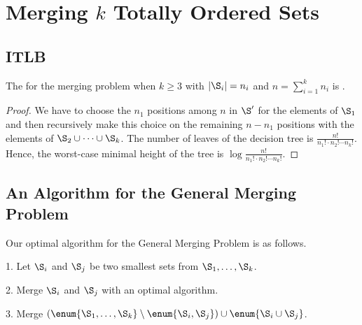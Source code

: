 \section{Merging $k$ Totally Ordered Sets}
\label{tree:merging:kgeq3}


\subsection*{ITLB}
\label{tree:merging:kgeq3:ITLB}


\begin{theorem}
The  for the merging problem when $k \geq 3$ with $|\S_i| = n_i$ and $n =
\sum_{i=1}^{k} n_i$ is .
\end{theorem}

\begin{proof}
We have to choose the $n_1$ positions among $n$ in $\S'$ for the elements of
$\S_1$ and then recursively make this choice on the remaining $n - n_1$
positions with the elements of \(\S_2 \cup \dots \cup \S_k\). The number of
leaves of the decision tree is $\frac{n!}{n_1! \cdot n_2! \cdots n_k!}$. Hence, the
worst-case minimal height of the tree is $\log \frac{n!}{n_1! \cdot n_2! \cdots
n_k!}$.
\end{proof}


\subsection*{An Algorithm for the General Merging Problem}
\label{tree:merging:kgeq3:alg}

Our optimal algorithm for the General Merging Problem is as follows.

\begin{algorithm}
\item[1.] Let \(\S_i\) and \(\S_j\) be two smallest sets from \(\S_1 ,
\dots , \S_k\).
\item[2.] Merge \(\S_i\) and \(\S_j\) with an optimal algorithm.
\item[3.] Merge \((\enum{\S_1 , \dots , \S_k} \setminus \enum{\S_i,\S_j} )
\cup \enum{\S_i \cup \S_j}\).
\end{algorithm}

